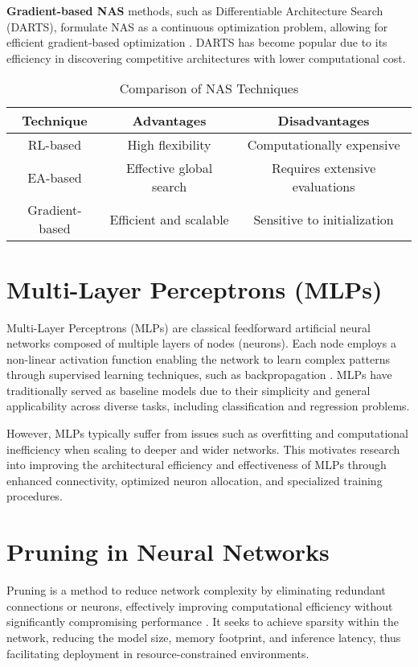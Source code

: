 \textbf{Gradient-based NAS} methods, such as Differentiable Architecture Search (DARTS), formulate NAS as a continuous optimization problem, allowing for efficient gradient-based optimization \cite{liu2018darts}. DARTS has become popular due to its efficiency in discovering competitive architectures with lower computational cost.

\begin{table}[ht]
\centering
\caption{Comparison of NAS Techniques}
\begin{tabular}{|c|c|c|}
\hline
\textbf{Technique} & \textbf{Advantages} & \textbf{Disadvantages} \\
\hline
RL-based & High flexibility & Computationally expensive \\
\hline
EA-based & Effective global search & Requires extensive evaluations \\
\hline
Gradient-based & Efficient and scalable & Sensitive to initialization \\
\hline
\end{tabular}
\label{tab:nas_techniques}
\end{table}


\section{Multi-Layer Perceptrons (MLPs)}
Multi-Layer Perceptrons (MLPs) are classical feedforward artificial neural networks composed of multiple layers of nodes (neurons). Each node employs a non-linear activation function enabling the network to learn complex patterns through supervised learning techniques, such as backpropagation \cite{rumelhart1986learning}. MLPs have traditionally served as baseline models due to their simplicity and general applicability across diverse tasks, including classification and regression problems.

However, MLPs typically suffer from issues such as overfitting and computational inefficiency when scaling to deeper and wider networks. This motivates research into improving the architectural efficiency and effectiveness of MLPs through enhanced connectivity, optimized neuron allocation, and specialized training procedures.

\section{Pruning in Neural Networks}
Pruning is a method to reduce network complexity by eliminating redundant connections or neurons, effectively improving computational efficiency without significantly compromising performance \cite{han2015learning}. It seeks to achieve sparsity within the network, reducing the model size, memory footprint, and inference latency, thus facilitating deployment in resource-constrained environments.

